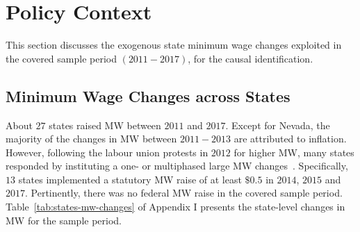 \documentclass[12pt, english]{article}
\begin{document}
    \section{Policy Context}\label{sec:policy-context}
    This section discusses the exogenous state minimum wage changes exploited in the covered sample period $(2011-2017)$, for the causal identification.

    \subsection{Minimum Wage Changes across States}\label{subsec:minimum-wage-changes-across-states}
    About $27$ states raised MW between $2011$ and $2017$. Except for Nevada, the majority of the changes in MW between $2011-2013$ are attributed to inflation. However, following the labour union protests in $2012$ for higher MW, many states responded by instituting a one- or multiphased large MW changes~\parencite{lathrop2021raises}. Specifically, $13$ states implemented a statutory MW raise of at least $\$0.5$ in $2014$, $2015$ and $2017$. Pertinently, there was no federal MW raise in the covered sample period. Table~\ref{tab:states-mw-changes} of Appendix I presents the state-level changes in MW for the sample period.
\end{document}
